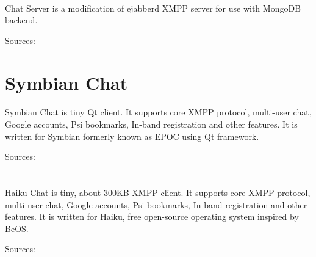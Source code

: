 \documentclass[11pt]{article}
\begin{document}
\paragraph{}
Chat Server is a modification of ejabberd XMPP server for use with MongoDB backend.

Sources: 


\section*{Symbian Chat}
\paragraph{}
Symbian Chat is tiny Qt client. It supports core XMPP protocol,
multi-user chat, Google accounts, Psi bookmarks, In-band registration
and other features. It is written for Symbian formerly known as EPOC using Qt framework.

Sources: 

\section*{}
\paragraph{}
Haiku Chat is tiny, about 300KB XMPP client.
It supports core XMPP protocol, multi-user chat, Google accounts,
Psi bookmarks, In-band registration and other features.
It is written for Haiku, free open-source operating system inspired by BeOS.

Sources: 

\section*{}
\end{document}
